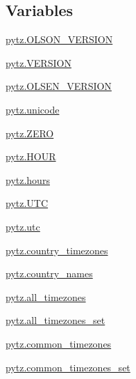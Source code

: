 \subsection*{Variables}
\begin{DoxyCompactItemize}
\item 
\hyperlink{namespacepytz_acfac5ce43a9cbf4370e913fdd09823fd}{pytz.\+O\+L\+S\+O\+N\+\_\+\+V\+E\+R\+S\+I\+ON}
\item 
\hyperlink{namespacepytz_abeb8992f4c2062ee7a06057a81fb32b8}{pytz.\+V\+E\+R\+S\+I\+ON}
\item 
\hyperlink{namespacepytz_ad20ee0e4fe22cfeab729b8fceedbe3c0}{pytz.\+O\+L\+S\+E\+N\+\_\+\+V\+E\+R\+S\+I\+ON}
\item 
\hyperlink{namespacepytz_a009a80d7121e28d768e98ff4c17e8143}{pytz.\+unicode}
\item 
\hyperlink{namespacepytz_a1ab5e8af2b17453c978d10ee2434766c}{pytz.\+Z\+E\+RO}
\item 
\hyperlink{namespacepytz_abc0dcd675cea2f2c99078059f1ff3f8b}{pytz.\+H\+O\+UR}
\item 
\hyperlink{namespacepytz_af8649e079377bfcda685487b70ffee4a}{pytz.\+hours}
\item 
\hyperlink{namespacepytz_a31f8b6b17d0fae5e40c63b26c0779755}{pytz.\+U\+TC}
\item 
\hyperlink{namespacepytz_a5504f2a21bc800e653c57de6aa2f4eff}{pytz.\+utc}
\item 
\hyperlink{namespacepytz_abfb013c5058754a68284b93ad20f3633}{pytz.\+country\+\_\+timezones}
\item 
\hyperlink{namespacepytz_aa4d8e6ba5de8d55fe984af30d09f1b4e}{pytz.\+country\+\_\+names}
\item 
\hyperlink{namespacepytz_a6b2d3edbe035a1b6410f3302cd83d3a7}{pytz.\+all\+\_\+timezones}
\item 
\hyperlink{namespacepytz_adda1f9fb3669a885d1976a5138adcdfc}{pytz.\+all\+\_\+timezones\+\_\+set}
\item 
\hyperlink{namespacepytz_a13415689e339f0e57015fde74581ab87}{pytz.\+common\+\_\+timezones}
\item 
\hyperlink{namespacepytz_acd5ed7bd5342964bad02f40bbe73ef1a}{pytz.\+common\+\_\+timezones\+\_\+set}
\end{DoxyCompactItemize}
